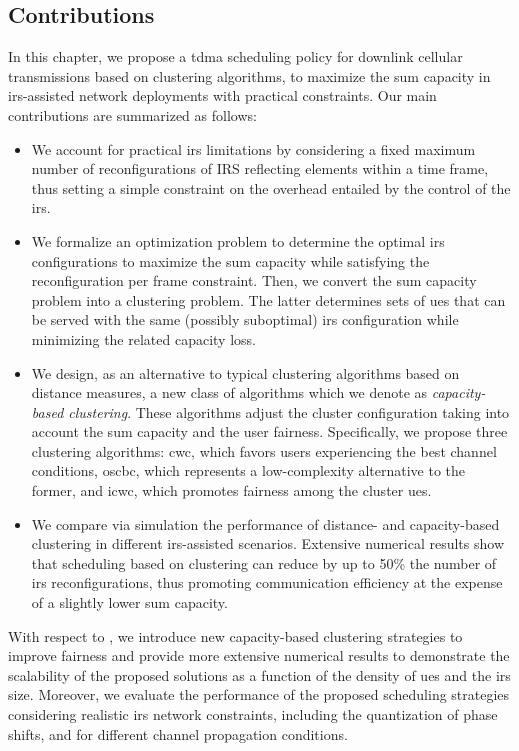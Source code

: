 \subsection{Contributions}
In this chapter, we propose a \gls{tdma} scheduling policy for downlink cellular transmissions based on clustering algorithms, to maximize the sum capacity in \gls{irs}-assisted network deployments with practical constraints.
Our main contributions are summarized as follows:
\begin{itemize}%
    \item We account for practical \gls{irs} limitations by considering a fixed maximum number of reconfigurations of IRS reflecting elements within a time frame, thus setting a simple constraint on the overhead entailed by the control of the \gls{irs}.
    \item We formalize an optimization problem to determine the optimal \gls{irs} configurations to maximize the sum capacity while satisfying the reconfiguration per frame constraint. Then, we convert the sum capacity problem into a clustering problem. The latter determines sets of \glspl{ue} that can be served with the same (possibly suboptimal) \gls{irs} configuration while minimizing the related capacity loss. %
    \item We design, as an alternative to typical clustering algorithms based on distance measures, a new class of algorithms which we denote as \textit{capacity-based clustering}. These algorithms adjust the cluster configuration taking into account the sum capacity and the user fairness.
     Specifically, we propose three clustering algorithms: \gls{cwc}, which favors users experiencing the best channel conditions, %
     \gls{oscbc}, which represents a low-complexity alternative to the former, and \gls{icwc}, which promotes fairness among the cluster \glspl{ue}.
    \item We compare via simulation the performance of distance- and capacity-based clustering in different \gls{irs}-assisted scenarios.
    Extensive numerical results show that scheduling based on clustering can reduce by up to 50\% the number of \gls{irs} reconfigurations, thus promoting communication efficiency at the expense of a slightly lower sum capacity. 
\end{itemize}
With respect to \cite{rech2023downlink}, we introduce new capacity-based clustering strategies to improve fairness and provide more extensive numerical results to demonstrate the scalability of the proposed solutions as a function of the density of \glspl{ue} and the \gls{irs} size. Moreover, we evaluate the performance of the proposed scheduling strategies considering realistic \gls{irs} network constraints, including the quantization of phase shifts, and for different channel propagation conditions.
